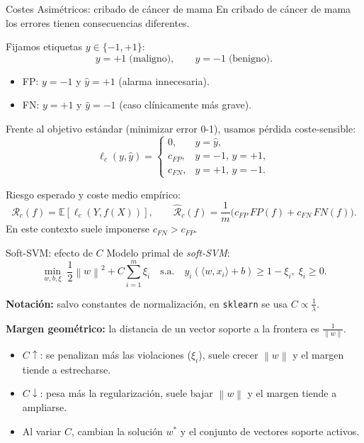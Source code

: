 \documentclass{beamer}
\newcommand{\norm}[1]{\left\lVert#1\right\rVert}
\begin{document}
\begin{frame}{Costes Asimétricos: cribado de cáncer de mama}
  En cribado de cáncer de mama los errores tienen consecuencias diferentes.

  \vspace{0.12in}

  Fijamos etiquetas $y \in \{-1,+1\}$:
  \[
  y=+1 \;\text{(maligno)}, \qquad y=-1 \;\text{(benigno)}.
  \]

  \vspace{0.05in}

  \begin{itemize}
    \item FP: $y=-1$ y $\hat y=+1$ (alarma innecesaria).
    \item FN: $y=+1$ y $\hat y=-1$ (caso clínicamente más grave).
  \end{itemize}

  Frente al objetivo estándar (minimizar error 0-1), usamos pérdida coste-sensible:
  \[
  \ell_c(y,\hat y)=
  \begin{cases}
    0, & y=\hat y,\\
    c_{FP}, & y=-1,\,\hat y=+1,\\
    c_{FN}, & y=+1,\,\hat y=-1.
  \end{cases}
  \]

  Riesgo esperado y coste medio empírico:
  \[
  \mathcal{R}_c(f)=\mathbb{E}[\ell_c(Y,f(X))], \qquad
  \widehat{\mathcal{R}}_c(f)=\frac{1}{m}\big(c_{FP}\,FP(f)+c_{FN}\,FN(f)\big).
  \]
  En este contexto suele imponerse $c_{FN}>c_{FP}$.
\end{frame}

\begin{frame}{Soft-SVM: efecto de $C$}
  Modelo primal de \textit{soft-SVM}:
  \[
  \min_{w,b,\xi}\;\frac{1}{2}\norm{w}^2 + C\sum_{i=1}^m \xi_i
  \quad \text{s.a.} \quad
  y_i(\langle w,x_i\rangle+b)\ge 1-\xi_i,\; \xi_i\ge 0.
  \]

  \textbf{Notación:} salvo constantes de normalización, en \texttt{sklearn} se usa
  $C\propto\frac{1}{\lambda}$.
  
  \vspace{0.02in}
  \textbf{Margen geométrico:} la distancia de un vector soporte a la frontera es
  $\frac{1}{\norm{w}}$.

  \vspace{0.05in}
  \begin{itemize}
    \item $C\uparrow$: se penalizan más las violaciones ($\xi_i$), suele crecer $\norm{w}$ y el margen tiende a estrecharse.
    \item $C\downarrow$: pesa más la regularización, suele bajar $\norm{w}$ y el margen tiende a ampliarse.
    \item Al variar $C$, cambian la solución $w^*$ y el conjunto de vectores soporte activos.
  \end{itemize}

  
\end{frame}
\end{document}
